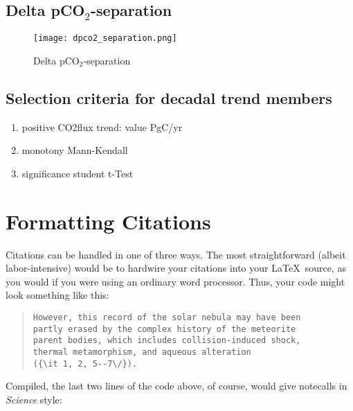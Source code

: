 \documentclass[12pt]{article}
\begin{document}
\subsection*{Delta pCO$_2$-separation}
\begin{figure}
\texttt{[image: dpco2\_separation.png]} %
\label{fig:dpco2_separation}
\caption{Delta pCO$_2$-separation \cite{Takahashi2002}}
\end{figure}


\subsection*{Selection criteria for decadal trend members}
\begin{enumerate}
\item positive CO2flux trend: value PgC/yr
\item monotony Mann-Kendall
\item significance student t-Test
\end{enumerate}

\newpage

\newpage

\newpage

\section*{Formatting Citations}

Citations can be handled in one of three ways.  The most
straightforward (albeit labor-intensive) would be to hardwire your
citations into your \LaTeX\ source, as you would if you were using an
ordinary word processor.  Thus, your code might look something like
this:


\begin{quote}
\begin{verbatim}
However, this record of the solar nebula may have been
partly erased by the complex history of the meteorite
parent bodies, which includes collision-induced shock,
thermal metamorphism, and aqueous alteration
({\it 1, 2, 5--7\/}).
\end{verbatim}
\end{quote}


\noindent Compiled, the last two lines of the code above, of course, would give notecalls in {\it Science\/} style:
\end{document}
